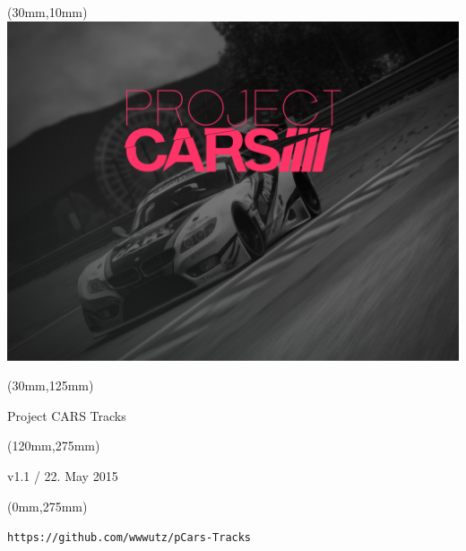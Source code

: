 \documentclass[oneside, a4paper, 12pt]{book}
\begin{document}
\selectfont
\textblockorigin{0cm}{0cm}

\newlength{\Logo}
\setlength{\Logo}{210mm-60mm}
\begin{textblock*}{\Logo}(30mm,10mm)%
\includegraphics[width=\Logo]{pcars-main.png}
\end{textblock*}

\begin{textblock*}{\Logo}(30mm,125mm)%
\begin{center}\Huge{Project CARS Tracks}\end{center}
\end{textblock*}

\begin{textblock*}{90mm}(120mm,275mm)%
\begin{center}\Huge{v1.1 / 22. May 2015}\end{center}
\end{textblock*}

\begin{textblock*}{90mm}(0mm,275mm)%
\begin{center}\tt{https://github.com/wwwutz/pCars-Tracks}\end{center}
\end{textblock*}



\end{document}
